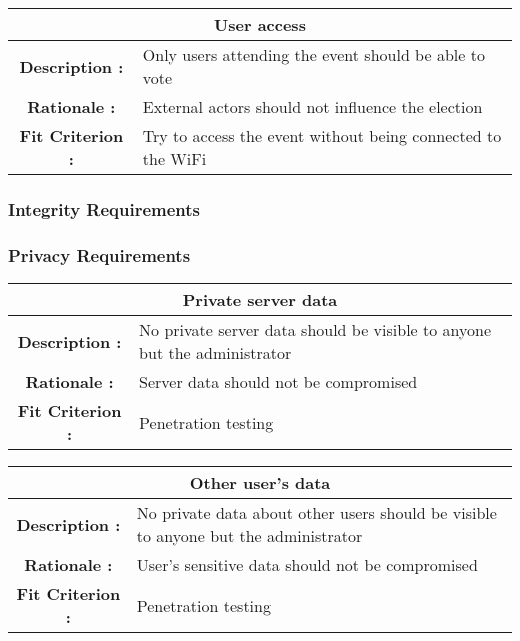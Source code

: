\documentclass[12pt, titlepage]{article}
\begin{document}
\begin{center}
\begin{table}[H]
\begin{tabularx}{\textwidth}{| c X |}
\hline
\multicolumn{2}{|c|}{\textbf{User access}}\\
\hline
\textbf{Description : } & Only users attending the event should be able to vote\\
\hline
\textbf{Rationale : } & External actors should not influence the election\\
\hline
\textbf{Fit Criterion : } & Try to access the event without being connected to
the WiFi\\
\hline
\end{tabularx}
\end{table}
\end{center}

\subsubsection{Integrity Requirements}
\subsubsection{Privacy Requirements}

\begin{center}
\begin{table}[H]
\begin{tabularx}{\textwidth}{| c X |}
\hline
\multicolumn{2}{|c|}{\textbf{Private server data}}\\
\hline
\textbf{Description : } & No private server data should be visible to anyone
but the administrator\\
\hline
\textbf{Rationale : } & Server data should not be compromised\\
\hline
\textbf{Fit Criterion : } & Penetration testing\\
\hline
\end{tabularx}
\end{table}
\end{center}

\begin{center}
\begin{table}[H]
\begin{tabularx}{\textwidth}{| c X |}
\hline
\multicolumn{2}{|c|}{\textbf{Other user's data}}\\
\hline
\textbf{Description : } & No private data about other users should be visible
to anyone but the administrator\\
\hline
\textbf{Rationale : } & User's sensitive data should not be compromised\\
\hline
\textbf{Fit Criterion : } & Penetration testing\\
\hline
\end{tabularx}
\end{table}
\end{center}
\end{document}
